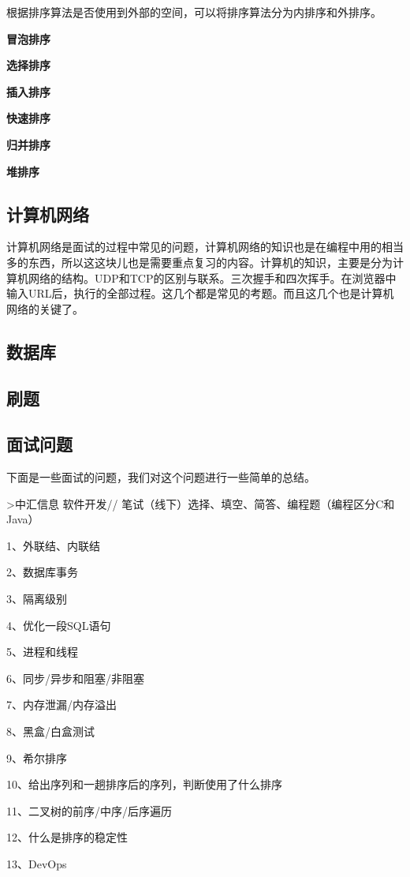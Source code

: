 \documentclass[UTF8]{ctexart}
\begin{document}
根据排序算法是否使用到外部的空间，可以将排序算法分为内排序和外排序。


\textbf{冒泡排序}


\textbf{选择排序}


\textbf{插入排序}


\textbf{快速排序}


\textbf{归并排序}


\textbf{堆排序}

\subsection{计算机网络}

计算机网络是面试的过程中常见的问题，计算机网络的知识也是在编程中用的相当多的东西，所以这这块儿也是需要重点复习的内容。计算机的知识，主要是分为计算机网络的结构。UDP和TCP的区别与联系。三次握手和四次挥手。在浏览器中输入URL后，执行的全部过程。这几个都是常见的考题。而且这几个也是计算机网络的关键了。

\subsection{数据库}
\subsection{刷题}


\subsection{面试问题}
下面是一些面试的问题，我们对这个问题进行一些简单的总结。

>中汇信息 软件开发// 笔试（线下）选择、填空、简答、编程题（编程区分C和Java）

1、外联结、内联结

2、数据库事务

3、隔离级别

4、优化一段SQL语句

5、进程和线程

6、同步/异步和阻塞/非阻塞

7、内存泄漏/内存溢出

8、黑盒/白盒测试

9、希尔排序

10、给出序列和一趟排序后的序列，判断使用了什么排序

11、二叉树的前序/中序/后序遍历

12、什么是排序的稳定性

13、DevOps
\end{document}
